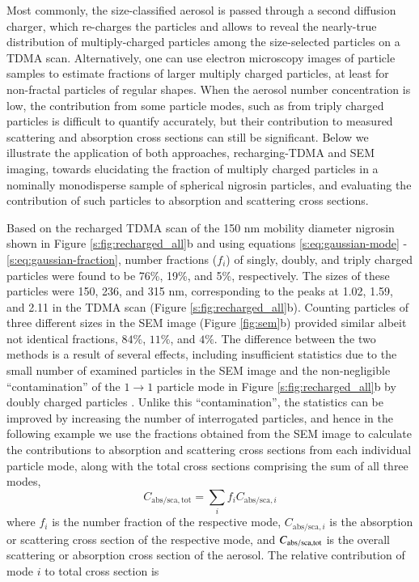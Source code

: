 \documentclass[12pt,authoryear]{elsarticle}
\begin{document}
Most commonly, the size-classified aerosol is passed through a second diffusion charger, which re-charges the particles and allows to reveal the nearly-true distribution of multiply-charged particles among the size-selected particles on a TDMA scan. Alternatively, one can use electron microscopy images of particle samples to estimate fractions of larger multiply charged particles, at least for non-fractal particles of regular shapes. When the aerosol number concentration is low, the contribution from some particle modes, such as from triply charged particles is difficult to quantify accurately, but their contribution to measured scattering and absorption cross sections can still be significant. Below we illustrate the application of both approaches, recharging-TDMA and SEM imaging, towards elucidating the fraction of multiply charged particles in a nominally monodisperse sample of spherical nigrosin particles, and evaluating the contribution of such particles to absorption and scattering cross sections.

Based on the recharged TDMA scan of the 150 nm mobility diameter nigrosin  shown in Figure \ref{s:fig:recharged_all}b and using equations \ref{s:eq:gaussian-mode} - \ref{s:eq:gaussian-fraction}, number fractions ($f_i$) of singly, doubly, and triply charged particles were found to be 76\%, 19\%, and 5\%, respectively. The sizes of these particles were 150, 236, and 315 nm, corresponding to the peaks at 1.02, 1.59, and 2.11 in the TDMA scan (Figure \ref{s:fig:recharged_all}b). Counting particles of three different sizes in the SEM image (Figure \ref{fig:sem}b) provided similar albeit not identical fractions, $84\%$, $11\%$, and $4\%$. The difference between the two methods is a result of several effects, including insufficient statistics due to the small number of examined particles in the SEM image and the non-negligible ``contamination'' of the $1\rightarrow 1$ particle mode in Figure \ref{s:fig:recharged_all}b by doubly charged particles \citep{RN7}. Unlike this ``contamination'', the statistics can be improved by increasing the number of interrogated particles, and hence in the following example we use the fractions obtained from the SEM image to calculate the contributions to absorption and scattering cross sections from each individual particle mode, along with the total cross sections comprising the sum of all three modes,
\begin{equation}
    C_\mathrm{abs/sca,tot}=\sum_{i}{f_iC_{\mathrm{abs/sca},i}}
    \label{eq:total_corss_section}
\end{equation}
where $f_i$ is the number fraction of the respective mode, $C_{\mathrm{abs/sca},i}$ is the absorption or scattering cross section of the respective mode, and $C_{\rm abs/sca,tot}$ is the overall scattering or absorption cross section of the aerosol. The relative contribution of mode $i$ to total cross section is
\end{document}
